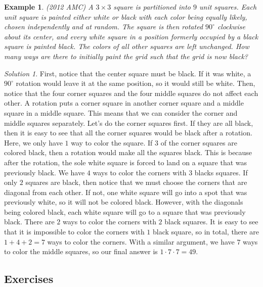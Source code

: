 \documentclass[letterpaper]{article}
\newtheorem{example}[thm]{Example}
\theoremstyle{remark}
\newtheorem*{solution}{Solution}
\theoremstyle{definition}
\begin{document}
\begin{example}
(2012 AMC) A $3\times3$ square is partitioned into $9$ unit squares. Each unit square is painted either white or black with each color being equally likely, chosen independently and at random. The square is then rotated $90^\circ$ clockwise about its center, and every white square in a position formerly occupied by a black square is painted black. The colors of all other squares are left unchanged. How many ways are there to initially paint the grid such that the grid is now black?

\end{example}

\begin{solution}


First, notice that the center square must be black. If it was white, a $90^\circ$ rotation would leave it at the same position, so it would still be white. Then, notice that the four corner squares and the four middle squares do not affect each other. A rotation puts a corner square in another corner square and a middle square in a middle square. This means that we can consider the corner and middle squares separately. Let's do the corner squares first. If they are all black, then it is easy to see that all the corner squares would be black after a rotation. Here, we only have $1$ way to color the square. If $3$ of the corner squares are colored black, then a rotation would make all the squares black. This is because after the rotation, the sole white square is forced to land on a square that was previously black. We have $4$ ways to color the corners with $3$ blacks squares. If only $2$ squares are black, then notice that we must choose the corners that are diagonal from each other. If not, one white square will go into a spot that was previously white, so it will not be colored black. However, with the diagonals being colored black, each white square will go to a square that was previously black. There are $2$ ways to color the corners with $2$ black squares. It is easy to see that it is impossible to color the corners with $1$ black square, so in total, there are $1+4+2=7$ ways to color the corners. With a similar argument, we have $7$ ways to color the middle squares, so our final answer is $1\cdot 7 \cdot 7=49$.
\end{solution}

\subsection*{Exercises}
\end{document}
